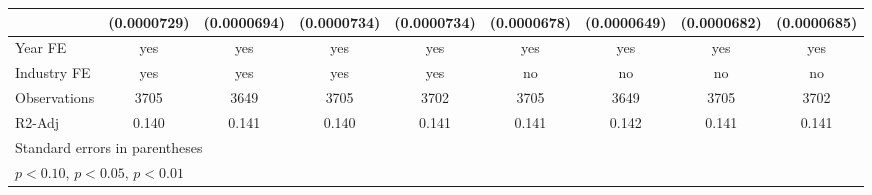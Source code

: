 \begin{table}[htbp]
\begin{tabular}{l*{8}{c}}
                    & (0.0000729)         & (0.0000694)         & (0.0000734)         & (0.0000734)         & (0.0000678)         & (0.0000649)         & (0.0000682)         & (0.0000685)         \\
\hline
Year FE             &         yes         &         yes         &         yes         &         yes         &         yes         &         yes         &         yes         &         yes         \\
Industry FE         &         yes         &         yes         &         yes         &         yes         &          no         &          no         &          no         &          no         \\
Observations        &        3705         &        3649         &        3705         &        3702         &        3705         &        3649         &        3705         &        3702         \\
R2-Adj              &       0.140         &       0.141         &       0.140         &       0.141         &       0.141         &       0.142         &       0.141         &       0.141         \\
\hline\hline
\multicolumn{9}{l}{\footnotesize Standard errors in parentheses}\\
\multicolumn{9}{l}{\footnotesize \sym{*} \(p<0.10\), \sym{**} \(p<0.05\), \sym{***} \(p<0.01\)}\\
\end{tabular}
\end{table}
